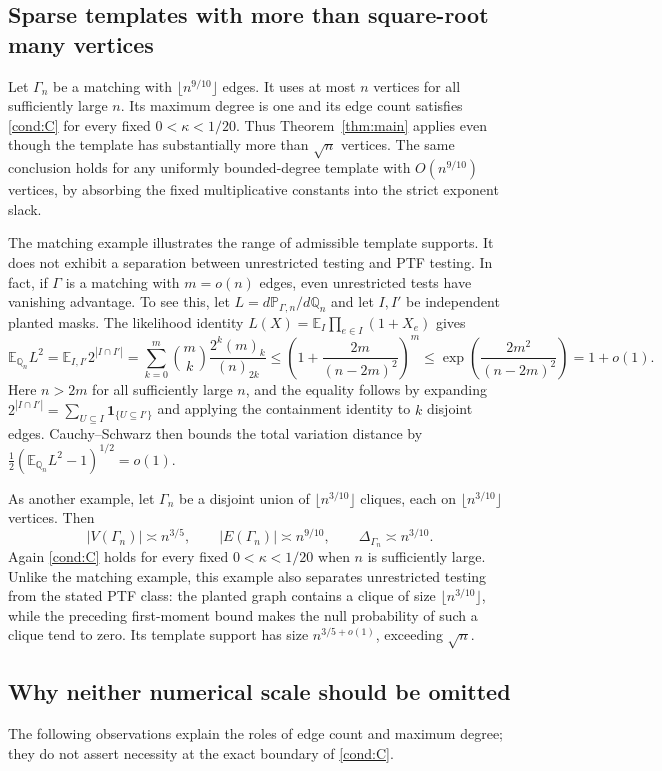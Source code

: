 \documentclass[11pt]{article}
\newcommand{\E}{\mathbb E}
\newcommand{\Pp}{\mathbb P}
\newcommand{\Qq}{\mathbb Q}
\newcommand{\1}{\mathbf 1}
\theoremstyle{definition}
\theoremstyle{remark}
\numberwithin{equation}{section}
\begin{document}
\subsection{Sparse templates with more than square-root many vertices}
Let $\Gamma_n$ be a matching with $\lfloor n^{9/10}\rfloor$ edges. It uses at most $n$ vertices for all sufficiently large $n$. Its maximum degree is one and its edge count satisfies \eqref{cond:C} for every fixed $0<\kappa<1/20$. Thus Theorem~\ref{thm:main} applies even though the template has substantially more than $\sqrt n$ vertices. The same conclusion holds for any uniformly bounded-degree template with $O(n^{9/10})$ vertices, by absorbing the fixed multiplicative constants into the strict exponent slack.

The matching example illustrates the range of admissible template supports. It does not exhibit a separation between unrestricted testing and PTF testing. In fact, if $\Gamma$ is a matching with $m=o(n)$ edges, even unrestricted tests have vanishing advantage. To see this, let $L=d\Pp_{\Gamma,n}/d\Qq_n$ and let $I,I'$ be independent planted masks. The likelihood identity $L(X)=\E_I\prod_{e\in I}(1+X_e)$ gives
\[
 \E_{\Qq_n}L^2
 =\E_{I,I'}2^{|I\cap I'|}
 =\sum_{k=0}^m\binom mk\frac{2^k(m)_k}{(n)_{2k}}
 \le\left(1+\frac{2m}{(n-2m)^2}\right)^m
 \le\exp\left(\frac{2m^2}{(n-2m)^2}\right)=1+o(1).
\]
Here $n>2m$ for all sufficiently large $n$, and the equality follows by expanding $2^{|I\cap I'|}=\sum_{U\subseteq I}\1_{\{U\subseteq I'\}}$ and applying the containment identity to $k$ disjoint edges. Cauchy--Schwarz then bounds the total variation distance by $\tfrac12(\E_{\Qq_n}L^2-1)^{1/2}=o(1)$.

As another example, let $\Gamma_n$ be a disjoint union of $\lfloor n^{3/10}\rfloor$ cliques, each on $\lfloor n^{3/10}\rfloor$ vertices. Then
\[
 |V(\Gamma_n)|\asymp n^{3/5},\qquad
 |E(\Gamma_n)|\asymp n^{9/10},\qquad
 \Delta_{\Gamma_n}\asymp n^{3/10}.
\]
Again \eqref{cond:C} holds for every fixed $0<\kappa<1/20$ when $n$ is sufficiently large.
Unlike the matching example, this example also separates unrestricted testing from the stated PTF class: the planted graph contains a clique of size $\lfloor n^{3/10}\rfloor$, while the preceding first-moment bound makes the null probability of such a clique tend to zero. Its template support has size $n^{3/5+o(1)}$, exceeding $\sqrt n$.


\subsection{Why neither numerical scale should be omitted}
The following observations explain the roles of edge count and maximum degree; they do not assert necessity at the exact boundary of \eqref{cond:C}.
\end{document}
